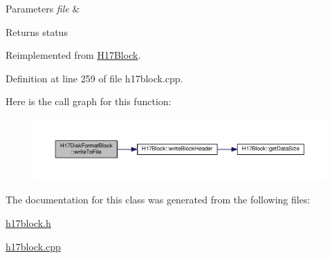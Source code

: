 \begin{DoxyParams}{Parameters}
{\em file} & \\
\hline
\end{DoxyParams}
\begin{DoxyReturn}{Returns}
status 
\end{DoxyReturn}


Reimplemented from \hyperlink{classH17Block_a59901675cd140c907fb6de4c8e0452d5}{H17\+Block}.



Definition at line 259 of file h17block.\+cpp.



Here is the call graph for this function\+:
\nopagebreak
\begin{figure}[H]
\begin{center}
\leavevmode
\includegraphics[width=350pt]{classH17DiskFormatBlock_af49df48b3a9626b2dab1731fd366ee8f_cgraph}
\end{center}
\end{figure}




The documentation for this class was generated from the following files\+:\begin{DoxyCompactItemize}
\item 
\hyperlink{h17block_8h}{h17block.\+h}\item 
\hyperlink{h17block_8cpp}{h17block.\+cpp}\end{DoxyCompactItemize}
